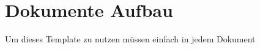 




\maketitle %
\tableofcontents %

\newpage %

\section{Dokumente Aufbau}

Um dieses Template zu nutzen müssen einfach in jedem Dokument


